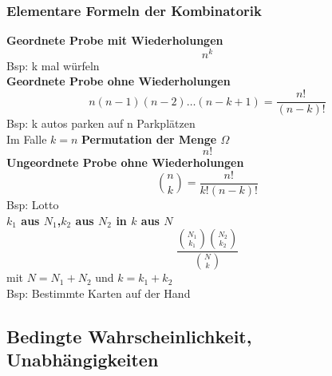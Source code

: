 \documentclass[
	ngerman,
	accentcolor=9c,%
	type=intern,
	marginpar=false
	]{tudapub}
\begin{document}
            \subsubsection{Elementare Formeln der Kombinatorik}
                \textbf{Geordnete Probe mit Wiederholungen}\\
                \begin{equation*}
                    n^k
                \end{equation*}
                Bsp: k mal würfeln\\
                \textbf{Geordnete Probe ohne Wiederholungen}
                \begin{equation*}
                    n(n-1)(n-2)\dots(n-k+1) = \dfrac{n!}{(n-k)!}
                \end{equation*}
                Bsp: k autos parken auf n Parkplätzen\\
                Im Falle $k=n$ \textbf{Permutation der Menge $\Omega$}
                \begin{equation*}
                    n!
                \end{equation*}
                \textbf{Ungeordnete Probe ohne Wiederholungen}
                \begin{equation*}
                    \binom{n}{k} = \dfrac{n!}{k!(n-k)!}
                \end{equation*}
                Bsp: Lotto\\
                \textbf{$k_1$ aus $N_1$,$k_2$ aus $N_2$ in $k$ aus $N$}
                \begin{equation*}
                    \dfrac{\binom{N_1}{k_1}\binom{N_2}{k_2}}{\binom{N}{k}}
                \end{equation*}
                mit $N = N_1 + N_2$ und $k = k_1+ k_2$\\
                Bsp: Bestimmte Karten auf der Hand
        \subsection{Bedingte Wahrscheinlichkeit, Unabhängigkeiten}
\end{document}

